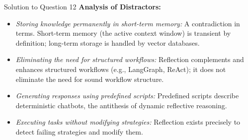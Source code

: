 \documentclass[11pt,a4paper]{article}
\begin{document}
\begin{solutionbox}{Solution to Question 12}
\medskip
\textbf{Analysis of Distractors:}
\begin{itemize}[leftmargin=1.5cm]
    \item[\textbf{(b)}] \textit{Storing knowledge permanently in short-term memory:} A contradiction in terms. Short-term memory (the active context window) is transient by definition; long-term storage is handled by vector databases.
    \item[\textbf{(c)}] \textit{Eliminating the need for structured workflows:} Reflection complements and enhances structured workflows (e.g., LangGraph, ReAct); it does not eliminate the need for sound workflow structure.
    \item[\textbf{(d)}] \textit{Generating responses using predefined scripts:} Predefined scripts describe deterministic chatbots, the antithesis of dynamic reflective reasoning.
    \item[\textbf{(e)}] \textit{Executing tasks without modifying strategies:} Reflection exists precisely to detect failing strategies and modify them.
\end{itemize}
\end{solutionbox}
\end{document}

